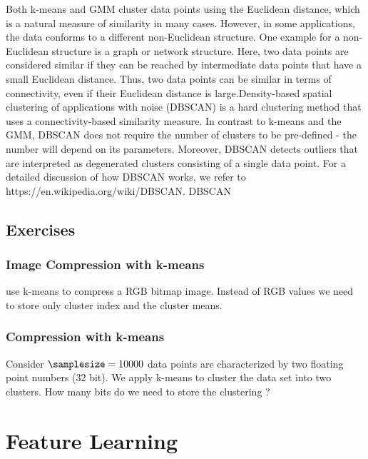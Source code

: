 \documentclass[12pt]{report}
\begin{document}
Both k-means and GMM cluster data points using the Euclidean distance, 
which is a natural measure of similarity in many cases. However, in some 
applications, the data conforms to a different non-Euclidean structure. 
One example for a non-Euclidean structure is a graph or network structure. 
Here, two data points are considered similar if they can be reached by 
intermediate data points that have a small Euclidean distance. Thus, 
two data points can be similar in terms of connectivity, even if their 
Euclidean distance is large.Density-based spatial clustering of 
applications with noise (DBSCAN) is a hard clustering method that 
uses a connectivity-based similarity measure. In contrast to k-means 
and the GMM, DBSCAN does not require the number of clusters to 
be pre-defined -  the number will depend on its parameters. Moreover, 
DBSCAN detects outliers that are interpreted as degenerated clusters 
consisting of a single data point. For a detailed discussion of how 
DBSCAN works, we refer to https://en.wikipedia.org/wiki/DBSCAN.  DBSCAN 

\section{Exercises} 
\subsection{Image Compression with k-means} 
use k-means to compress a RGB bitmap image. Instead of RGB values 
we need to store only cluster index and the cluster means. 

\subsection{Compression with k-means} 
Consider $\samplesize=10000$ data points are characterized by two 
floating point numbers (32 bit). We apply k-means to cluster the 
data set into two clusters. How many bits do we need to store the 
clustering ? 


\newpage
\chapter{Feature Learning} 
\label{ch_FeatureLearning}
\end{document}
